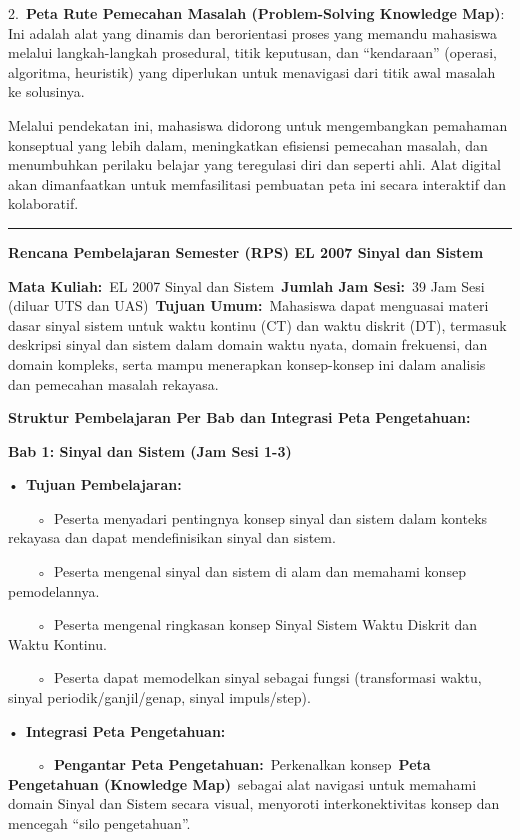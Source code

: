 \documentclass[
  letterpaper,
  DIV=11,
  numbers=noendperiod]{scrreprt}
\begin{document}
2.~\textbf{Peta Rute Pemecahan Masalah (Problem-Solving Knowledge Map)}:
Ini adalah alat yang dinamis dan berorientasi proses yang memandu
mahasiswa melalui langkah-langkah prosedural, titik keputusan, dan
``kendaraan'' (operasi, algoritma, heuristik) yang diperlukan untuk
menavigasi dari titik awal masalah ke solusinya.

Melalui pendekatan ini, mahasiswa didorong untuk mengembangkan pemahaman
konseptual yang lebih dalam, meningkatkan efisiensi pemecahan masalah,
dan menumbuhkan perilaku belajar yang teregulasi diri dan seperti ahli.
Alat digital akan dimanfaatkan untuk memfasilitasi pembuatan peta ini
secara interaktif dan kolaboratif.

\begin{center}\rule{0.5\linewidth}{0.5pt}\end{center}

\textbf{Rencana Pembelajaran Semester (RPS) EL 2007 Sinyal dan Sistem}

\textbf{Mata Kuliah:}~EL 2007 Sinyal dan Sistem~\textbf{Jumlah Jam
Sesi:}~39 Jam Sesi (diluar UTS dan UAS)~\textbf{Tujuan Umum:}~Mahasiswa
dapat menguasai materi dasar sinyal sistem untuk waktu kontinu (CT) dan
waktu diskrit (DT), termasuk deskripsi sinyal dan sistem dalam domain
waktu nyata, domain frekuensi, dan domain kompleks, serta mampu
menerapkan konsep-konsep ini dalam analisis dan pemecahan masalah
rekayasa.

\textbf{Struktur Pembelajaran Per Bab dan Integrasi Peta Pengetahuan:}

\textbf{Bab 1: Sinyal dan Sistem (Jam Sesi 1-3)}

•~\textbf{Tujuan Pembelajaran:}

~~~~◦~Peserta menyadari pentingnya konsep sinyal dan sistem dalam
konteks rekayasa dan dapat mendefinisikan sinyal dan sistem.

~~~~◦~Peserta mengenal sinyal dan sistem di alam dan memahami konsep
pemodelannya.

~~~~◦~Peserta mengenal ringkasan konsep Sinyal Sistem Waktu Diskrit dan
Waktu Kontinu.

~~~~◦~Peserta dapat memodelkan sinyal sebagai fungsi (transformasi
waktu, sinyal periodik/ganjil/genap, sinyal impuls/step).

•~\textbf{Integrasi Peta Pengetahuan:}

~~~~◦~\textbf{Pengantar Peta Pengetahuan:}~Perkenalkan
konsep~\textbf{Peta Pengetahuan (Knowledge Map)}~sebagai alat navigasi
untuk memahami domain Sinyal dan Sistem secara visual, menyoroti
interkonektivitas konsep dan mencegah ``silo pengetahuan''.
\end{document}
